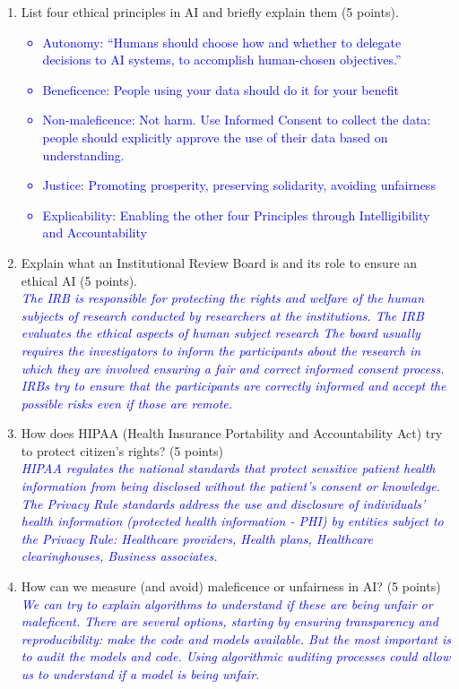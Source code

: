 \documentclass[12pt]{article}
\newcommand{\solution}[2]{\\[2mm] \textcolor{blue}{\em #1}} %
\begin{document}
\begin{enumerate}

\item List four ethical principles in AI and briefly explain them (5 points).
\solution{
\begin{itemize}
    \item Autonomy:
“Humans should choose how and whether to delegate decisions to AI systems, to accomplish human-chosen objectives.”
    \item Beneficence: 
People using your data should do it for your benefit
    \item Non-maleficence: 
Not harm. Use Informed Consent to collect the data: people should explicitly approve the use of their data based on understanding.
    \item Justice: 
Promoting prosperity, preserving solidarity, avoiding unfairness
    \item Explicability: Enabling the other four Principles through Intelligibility and Accountability
\end{itemize}}{\vspace{4.5cm}}

\item Explain what an Institutional Review Board is and its role to ensure an ethical AI (5 points).
\solution{The IRB is responsible for protecting the rights and welfare of the human subjects of research conducted by researchers at the institutions.
The IRB evaluates the ethical aspects of human subject research
The board usually requires the investigators to inform the participants about the research in which they are involved ensuring a fair and correct informed consent process. IRBs try to ensure that the participants are correctly informed and accept the possible risks even if those are remote.}{\vspace{4.5cm}}


\item How does HIPAA (Health Insurance Portability and Accountability Act) try to protect citizen's rights? (5 points)
\solution{HIPAA regulates the national standards that protect sensitive patient health information from being disclosed without the patient’s consent or knowledge. The Privacy Rule standards address the use and disclosure of individuals’ health information (protected health information - PHI) by entities subject to the Privacy Rule: Healthcare providers, Health plans, Healthcare clearinghouses, Business associates.
}{\vspace{4.5cm}}

\item How can we measure (and avoid) maleficence or unfairness in AI? (5 points)
\solution{We can try to explain algorithms to understand if these are being unfair or maleficent. There are several options, starting by ensuring transparency and reproducibility: make the code and models available. But the most important is to audit the models and code. Using algorithmic auditing processes could allow us to understand if a model is being unfair.}{\vspace{5cm}}


\end{enumerate}
\end{document}
